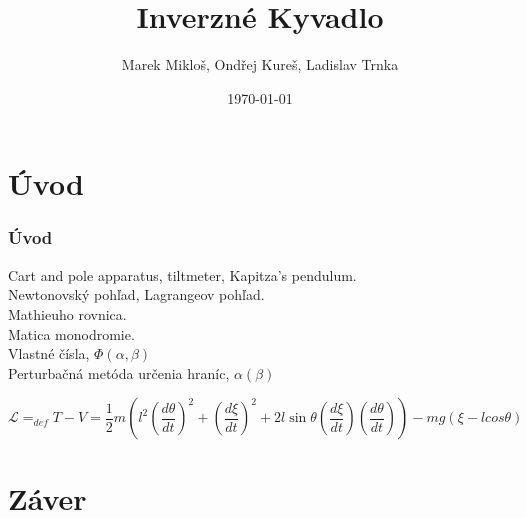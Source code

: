 \documentclass{beamer}
\title[Mechanika]{Inverzné Kyvadlo}
\author[Skupina Z] {Marek Mikloš, Ondřej Kureš, Ladislav Trnka \\ }
\institute[Charles University]{Charles University, Czech Republic}
\date{\today}
\begin{document}

\section*{Úvod}
\label{sec: Int}


\begin{frame}
 
 \frametitle{Úvod}
 \begin{center}
 Cart and pole apparatus, tiltmeter, Kapitza's pendulum.\\    
 Newtonovský pohľad, Lagrangeov pohľad.\\
 Mathieuho rovnica.\\
 Matica monodromie.\\
 Vlastné čísla, $\Phi(\alpha,\beta)$ \\
 Perturbačná metóda určenia hraníc, $\alpha(\beta)$ \\
 \end{center}

 \begin{equation*}
\mathcal{L}=_{def}T-V=\frac{1}{2}m(l^2(\frac{d\theta}{dt})^2+(\frac{d\xi}{dt})^2+2l\sin\theta(\frac{d\xi}{dt})(\frac{d\theta}{dt}))-mg(\xi-lcos{\theta})
 \end{equation*}


 
\end{frame}
 

\section*{Záver}
\label{sec:Záver}
\end{document}
